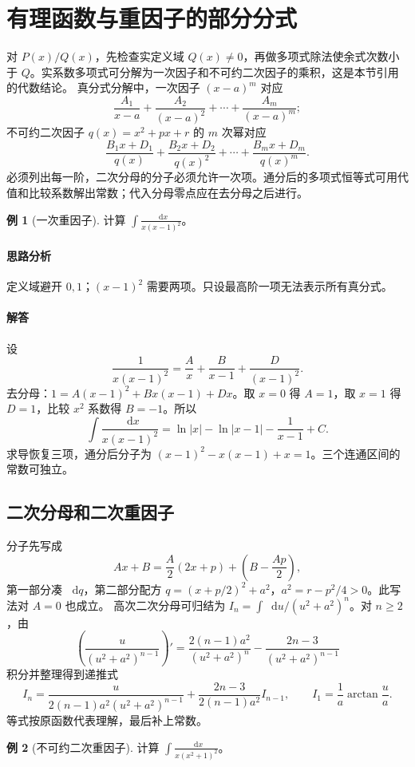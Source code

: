 \documentclass[UTF8,fontset=fandol,12pt,oneside,openany]{ctexrep}
\newcommand{\dd}{\mathop{}\!\mathrm d}
\theoremstyle{definition}
\newtheorem{example}{例}[chapter]
\begin{document}
\section{有理函数与重因子的部分分式}
\label{lec:10:rational}
对 $P(x)/Q(x)$，先检查实定义域 $Q(x)\ne0$，再做多项式除法使余式次数小于 $Q$。实系数多项式可分解为一次因子和不可约二次因子的乘积，这是本节引用的代数结论。
真分式分解中，一次因子 $(x-a)^m$ 对应
\[
\frac{A_1}{x-a}+\frac{A_2}{(x-a)^2}+\cdots+\frac{A_m}{(x-a)^m};
\]
不可约二次因子 $q(x)=x^2+px+r$ 的 $m$ 次幂对应
\[
\frac{B_1x+D_1}{q(x)}+\frac{B_2x+D_2}{q(x)^2}+\cdots+
\frac{B_mx+D_m}{q(x)^m}.
\]
必须列出每一阶，二次分母的分子必须允许一次项。通分后的多项式恒等式可用代值和比较系数解出常数；代入分母零点应在去分母之后进行。

\begin{example}[一次重因子]
计算 $\displaystyle\int\frac{\dd x}{x(x-1)^2}$。
\end{example}
\paragraph{思路分析}定义域避开 $0,1$；$(x-1)^2$ 需要两项。只设最高阶一项无法表示所有真分式。
\paragraph{解答}设
\[
\frac1{x(x-1)^2}=\frac A x+\frac B{x-1}+\frac D{(x-1)^2}.
\]
去分母：$1=A(x-1)^2+Bx(x-1)+Dx$。取 $x=0$ 得 $A=1$，取 $x=1$ 得 $D=1$，比较 $x^2$ 系数得 $B=-1$。所以
\[
\int\frac{\dd x}{x(x-1)^2}=\ln|x|-\ln|x-1|-\frac1{x-1}+C.
\]
求导恢复三项，通分后分子为 $(x-1)^2-x(x-1)+x=1$。三个连通区间的常数可独立。

\subsection{二次分母和二次重因子}
分子先写成
\[
Ax+B=\frac A2(2x+p)+\left(B-\frac{Ap}2\right),
\]
第一部分凑 $\dd q$，第二部分配方 $q=(x+p/2)^2+a^2$，$a^2=r-p^2/4>0$。此写法对 $A=0$ 也成立。
高次二次分母可归结为 $I_n=\int\dd u/(u^2+a^2)^n$。对 $n\ge2$，由
\[
\left(\frac{u}{(u^2+a^2)^{n-1}}\right)'
=\frac{2(n-1)a^2}{(u^2+a^2)^n}
-\frac{2n-3}{(u^2+a^2)^{n-1}}
\]
积分并整理得到递推式
\[
I_n=\frac{u}{2(n-1)a^2(u^2+a^2)^{n-1}}
+\frac{2n-3}{2(n-1)a^2}I_{n-1},
\qquad I_1=\frac1a\arctan\frac ua.
\]
等式按原函数代表理解，最后补上常数。

\begin{example}[不可约二次重因子]
计算 $\displaystyle\int\frac{\dd x}{x(x^2+1)^2}$。
\end{example}
\end{document}
